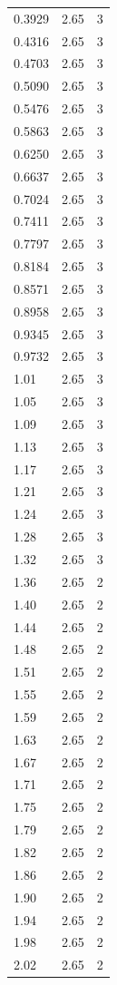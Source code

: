 \begin{longtable}{lrr}
  0.3929 & 2.65 & 3 \\
  0.4316 & 2.65 & 3 \\
  0.4703 & 2.65 & 3 \\
  0.5090 & 2.65 & 3 \\
  0.5476 & 2.65 & 3 \\
  0.5863 & 2.65 & 3 \\
  0.6250 & 2.65 & 3 \\
  0.6637 & 2.65 & 3 \\
  0.7024 & 2.65 & 3 \\
  0.7411 & 2.65 & 3 \\
  0.7797 & 2.65 & 3 \\
  0.8184 & 2.65 & 3 \\
  0.8571 & 2.65 & 3 \\
  0.8958 & 2.65 & 3 \\
  0.9345 & 2.65 & 3 \\
  0.9732 & 2.65 & 3 \\
  1.01 & 2.65 & 3 \\
  1.05 & 2.65 & 3 \\
  1.09 & 2.65 & 3 \\
  1.13 & 2.65 & 3 \\
  1.17 & 2.65 & 3 \\
  1.21 & 2.65 & 3 \\
  1.24 & 2.65 & 3 \\
  1.28 & 2.65 & 3 \\
  1.32 & 2.65 & 3 \\
  1.36 & 2.65 & 2 \\
  1.40 & 2.65 & 2 \\
  1.44 & 2.65 & 2 \\
  1.48 & 2.65 & 2 \\
  1.51 & 2.65 & 2 \\
  1.55 & 2.65 & 2 \\
  1.59 & 2.65 & 2 \\
  1.63 & 2.65 & 2 \\
  1.67 & 2.65 & 2 \\
  1.71 & 2.65 & 2 \\
  1.75 & 2.65 & 2 \\
  1.79 & 2.65 & 2 \\
  1.82 & 2.65 & 2 \\
  1.86 & 2.65 & 2 \\
  1.90 & 2.65 & 2 \\
  1.94 & 2.65 & 2 \\
  1.98 & 2.65 & 2 \\
  2.02 & 2.65 & 2 \\

\end{longtable}
